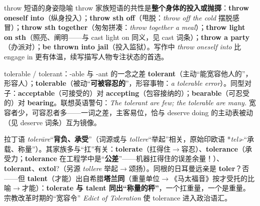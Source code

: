 \documentclass[../main.tex]{subfiles}
\begin{document}
\begin{gram}{throw 短语的身姿隐喻}
throw 家族短语的共性是\textbf{整个身体的投入或抛掷}：\textbf{throw oneself into}（纵身投入）；\textbf{throw sth off}（甩脱：\textit{throw off the cold} 摆脱感冒）；\textbf{throw sth together}（匆匆拼凑：\textit{throw together a meal}）；\textbf{throw light on sth}（照亮、阐明——与 cast light on 同义，见 cast 词条）；\textbf{throw a party}（办派对）；\textbf{be thrown into jail}（投入监狱）。写作中 \textit{throw oneself into} 比 engage in 更有体温，续写描写人物专注状态的首选。
\end{gram}



\begin{gram}{tolerable / tolerant：-able 与 -ant 的一念之差}
\textbf{tolerant}（主动“能宽容他人的”，形容人）；\textbf{tolerable}（被动“\textbf{可被容忍的}”，形容事物：\textit{a tolerable error}）。同型对子：\textbf{acceptable}（可接受的）对 \textbf{accepting}（包容接纳的）；\textbf{bearable}（可忍受的）对 \textbf{bearing}。联想英语警句：\textit{The tolerant are few; the tolerable are many.} 宽容者少，可容忍者多——一词之差，主客易位，恰与 deserve doing 的主动表被动（见 deserve 词条）互为镜像。
\end{gram}

\begin{origin}
拉丁语 \textit{tolerāre}“\textbf{背负、承受}”（词源或与 \textit{tollere}“举起”相关，原始印欧语 *\textit{telə-}“承载、称量”）。其家族多与“扛”有关：\textbf{tolerate}（扛得住$\to$容忍）、\textbf{tolerance}（承受力；\textbf{tolerance} 在工程学中是“\textbf{公差}”——机器扛得住的误差余量！）、\textbf{tolerant}、\textbf{extol}?（另源 \textit{tollere} 举起$\to$颂扬）。同根的日耳曼远亲是 \textbf{toler}？否——但 \textbf{talent}（才能）出自希腊\textbf{塔兰同}（重量单位$\to$《马太福音》按才受托的比喻$\to$才能）：\textbf{tolerate 与 talent 同出“称量的秤”}，一个扛重量，一个是重量。宗教改革时期的“宽容令” \textit{Edict of Toleration} 使 tolerance 进入政治语汇。
\end{origin}
\end{document}
